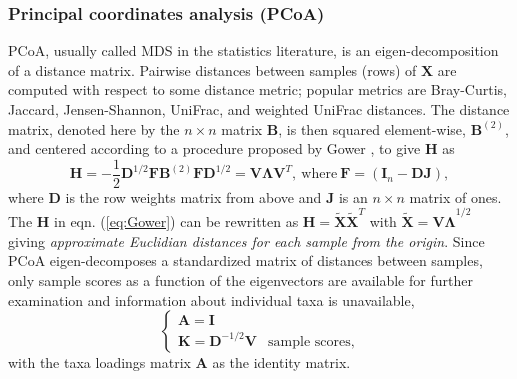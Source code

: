 \documentclass[doublespacing]{bmcart}
\def\I{\mathbf{I}}
\def\H{\mathbf{H}}
\def\D{\mathbf{D}}
\def\V{\mathbf{V}}
\def\A{\mathbf{A}}
\def\K{\mathbf{K}}
\begin{document}
\subsubsection*{Principal coordinates analysis (PCoA)}
PCoA, usually called MDS in the statistics literature, is an eigen-decomposition of a distance matrix. Pairwise distances between samples (rows) of $\mathbf X$ are computed with respect to some distance metric; popular metrics are Bray-Curtis, Jaccard, Jensen-Shannon, UniFrac, and weighted UniFrac distances. The distance matrix, denoted here by the $n \times n$ matrix $\mathbf B$, is then squared element-wise, $\mathbf B^{(2)}$, and centered according to a procedure proposed by Gower \cite{Gower}, to give $\H$ as 
\begin{equation}\label{eq:Gower}
\H = -\frac{1}{2}\mathbf D^{1/2}\mathbf F \mathbf B^{(2)} \mathbf F \mathbf D^{1/2} = \V \mathbf{\Lambda} \V^T, ~\mbox{where} ~\mathbf F = (\mathbf I_n - \D \mathbf J),
\end{equation}
where $\D$ is the row weights matrix from above and $\mathbf J$ is an $n \times n$ matrix of ones.
The $\H$ in eqn. (\ref{eq:Gower}) can be rewritten as $\H = \mathbf {\tilde X}\mathbf {\tilde X}^T$ with $\mathbf{\tilde X = V  \Lambda}^{1/2}$ giving {\it approximate Euclidian distances for each sample from the origin}. 
Since PCoA eigen-decomposes a standardized matrix of distances between samples, only sample scores as a function of the eigenvectors are available for further examination and information about individual taxa is unavailable,
\begin{equation*}
 \begin{cases}
    \A =  \I									 			&  \\
    \K =  \D^{-1/2}\V										& \text{sample scores},
  \end{cases}
\end{equation*} 
with the taxa loadings matrix $\A$ as the identity matrix. 
\end{document}
